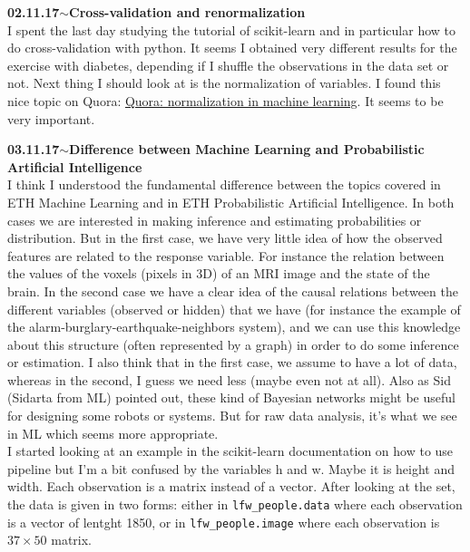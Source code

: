 \documentclass[11pt,a4paper]{article}
\newenvironment{loggentry}[2]%
{\noindent\textbf{#1}\hspace{1cm}$\mathbf{\sim}$\text{ }\textbf{#2}\\}{\vspace{0.5cm}}
\begin{document}
\begin{loggentry}{02.11.17}{Cross-validation and renormalization}
I spent the last day studying the tutorial of scikit-learn and in particular how to do cross-validation with python. It seems I obtained very different results for the exercise with diabetes, depending if I shuffle the observations in the data set or not. Next thing I should look at is the normalization of variables. I found this nice topic on Quora:
\href{https://www.quora.com/How-does-normalization-of-data-help-in-Machine-Learning}{Quora: normalization in machine learning}.
It seems to be very important.
\end{loggentry}

\begin{loggentry}{03.11.17}{Difference between Machine Learning and Probabilistic Artificial Intelligence}
I think I understood the fundamental difference between the topics covered in ETH Machine Learning and  in ETH Probabilistic Artificial Intelligence. In both cases we are interested in making inference and estimating probabilities or distribution. But in the first case, we have very little idea of how the observed features are related to the response variable. For instance the relation between the values of the voxels (pixels in 3D) of an MRI image and the state of the brain. In the second case we have a clear idea of the causal relations between the different variables (observed or hidden) that we have (for instance the example of the alarm-burglary-earthquake-neighbors system), and we can use this knowledge about this structure (often represented by a graph) in order to do some inference or estimation. I also think that in the first case, we assume to have a lot of data, whereas in the second, I guess we need less (maybe even not at all). Also as Sid (Sidarta from ML) pointed out, these kind of Bayesian networks might be useful for designing some robots or systems. But for raw data analysis, it's what we see in ML which seems more appropriate.\\
I started looking at an example in the scikit-learn documentation on how to use pipeline but I'm a bit confused by the variables h and w. Maybe it is height and width. Each observation is a matrix instead of a vector. After looking at the set, the data is given in two forms: either in \texttt{lfw\_people.data} where each observation is a vector of lentght 1850, or in \texttt{lfw\_people.image} where each observation is $37\times 50$ matrix.
\end{loggentry}
\end{document}

